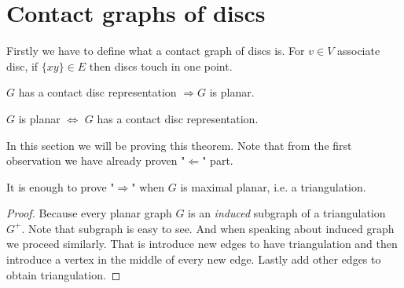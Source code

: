 \chapter{Contact graphs of discs}

Firstly we have to define what a contact graph of discs is. For $v \in V$ associate disc, if $\{xy\} \in E$ then discs touch in one point.

\begin{observ}
	$G$ has a contact disc representation $\Rightarrow G$ is planar.
\end{observ}

\begin{thm}[Koebe]
	$G$ is planar $\iff$ $G$ has a contact disc representation.
	\label{koebe}
\end{thm}

In this section we will be proving this theorem. Note that from the first observation we have already proven "$\Leftarrow$" part.

\begin{observ}
	It is enough to prove "$\Rightarrow$" when $G$ is maximal planar, i.e. a triangulation.
\end{observ}

\begin{proof}
	Because every planar graph $G$ is an \textit{induced} subgraph of a triangulation $G^+$. Note that subgraph is easy to see. And when speaking about induced graph we proceed similarly. That is introduce new edges to have triangulation and then introduce a vertex in the middle of every new edge. Lastly add other edges to obtain triangulation.
\end{proof}

